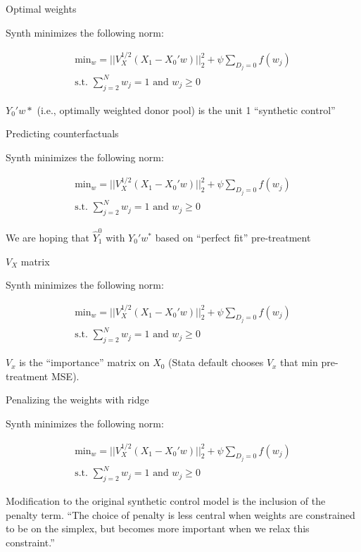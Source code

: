 \documentclass{beamer}
\begin{document}
\begin{frame}{Optimal weights}

Synth minimizes the following norm:

\begin{eqnarray*}
\textrm{min}_w = || V_X^{1/2} (X_1 - X_0'w) ||_2^2 + \psi \sum_{D_j=0}f(w_j)\\
\textrm{s.t. }\sum_{j=2}^N w_{j} =1 \textrm{ and } w_j \geq 0
\end{eqnarray*}

$Y_0'w*$ (i.e., optimally weighted donor pool) is the unit 1 ``synthetic control'' 

\end{frame}


\begin{frame}{Predicting counterfactuals}

Synth minimizes the following norm:

\begin{eqnarray*}
\textrm{min}_w = || V_X^{1/2} (X_1 - X_0'w) ||_2^2 + \psi \sum_{D_j=0}f(w_j)\\
\textrm{s.t. }\sum_{j=2}^N w_{j} =1 \textrm{ and } w_j \geq 0
\end{eqnarray*}

We are hoping that $\widehat{Y}_1^0$ with $Y_0' {w}^{*}$ based on ``perfect fit'' pre-treatment

\end{frame}




\begin{frame}{$V_X$ matrix}

Synth minimizes the following norm:

\begin{eqnarray*}
\textrm{min}_w = || V_X^{1/2} (X_1 - X_0'w) ||_2^2 + \psi \sum_{D_j=0}f(w_j)\\
\textrm{s.t. }\sum_{j=2}^N w_{j} =1 \textrm{ and } w_j \geq 0
\end{eqnarray*}

$V_x$ is the ``importance'' matrix on $X_0$ (Stata default chooses $V_x$ that min pre-treatment MSE).
\end{frame}

\begin{frame}{Penalizing the weights with ridge}

Synth minimizes the following norm:

\begin{eqnarray*}
\textrm{min}_w = || V_X^{1/2} (X_1 - X_0'w) ||_2^2 + \psi \sum_{D_j=0}f(w_j)\\
\textrm{s.t. }\sum_{j=2}^N w_{j} =1 \textrm{ and } w_j \geq 0
\end{eqnarray*}

Modification to the original synthetic control model is the inclusion of the penalty term. ``The choice of penalty is less central when weights are constrained to be on the simplex, but becomes more important when we relax this constraint.''

\end{frame}
\end{document}
